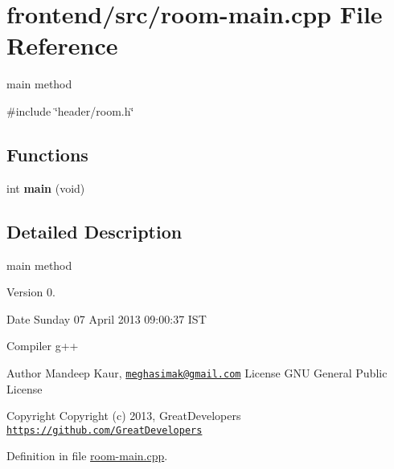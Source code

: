 \hypertarget{room-main_8cpp}{\section{frontend/src/room-\/main.cpp \-File \-Reference}
\label{room-main_8cpp}
}


main method  


{\ttfamily \#include \char`\"{}header/room.\-h\char`\"{}}\*
\subsection*{\-Functions}
\begin{DoxyCompactItemize}
\item 
\hypertarget{room-main_8cpp_a840291bc02cba5474a4cb46a9b9566fe}{int {\bfseries main} (void)}\label{room-main_8cpp_a840291bc02cba5474a4cb46a9b9566fe}

\end{DoxyCompactItemize}


\subsection{\-Detailed \-Description}
main method \begin{DoxyVersion}{\-Version}
0. 
\end{DoxyVersion}
\begin{DoxyDate}{\-Date}
\-Sunday 07 \-April 2013 09\-:00\-:37 \-I\-S\-T\par
 \-Compiler g++
\end{DoxyDate}
\begin{DoxyAuthor}{\-Author}
\-Mandeep \-Kaur, \href{mailto:meghasimak@gmail.com}{\tt meghasimak@gmail.\-com} \-License \-G\-N\-U \-General \-Public \-License 
\end{DoxyAuthor}
\begin{DoxyCopyright}{\-Copyright}
\-Copyright (c) 2013, \-Great\-Developers \href{https://github.com/GreatDevelopers}{\tt https\-://github.\-com/\-Great\-Developers} 
\end{DoxyCopyright}


\-Definition in file \hyperlink{room-main_8cpp_source}{room-\/main.\-cpp}.


